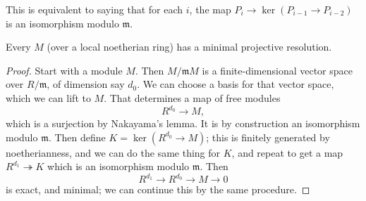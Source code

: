 This is equivalent to saying that for each $i$, the map $P_i
\to\ker(P_{i-1}
\to P_{i-2})$ is an isomorphism modulo $\mathfrak{m}$.

\begin{proposition}
Every $M$ (over a local noetherian ring) has a minimal
projective resolution.
\end{proposition}
\begin{proof}
Start with a module $M$. Then $M/\mathfrak{m}M$ is a
finite-dimensional vector
space over $R/\mathfrak{m}$, of dimension say $d_0$. We can
choose a basis for that vector space, which
we can lift to $M$. That determines a map of free modules
\[ R^{d_0} \to M,  \]
which is a surjection by Nakayama's lemma. It is by construction
an
isomorphism modulo $\mathfrak{m}$. Then define $K =
\ker(R^{d_0}\to M)$; this
is finitely generated by noetherianness, and we
can do the same thing for $K$, and repeat to get a map $R^{d_1}
\twoheadrightarrow K$ which is an isomorphism modulo
$\mathfrak{m}$. Then
\[ R^{d_1} \to R^{d_0} \to M \to 0  \]
is exact, and minimal; we can continue this by the same
procedure.
\end{proof}


